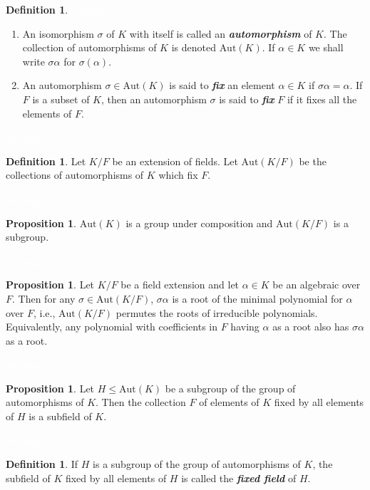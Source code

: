 \documentclass{article}
\theoremstyle{definition}
\newtheorem{prop}[thm]{Proposition}
\newtheorem{defn}[thm]{Definition}
\newcommand{\nl}{\textcolor{white}{nothing}}
\newcommand{\al}{\alpha}
\newcommand{\sig}{\sigma}
\newcommand{\Aut}{\text{Aut}}
\begin{document}
\begin{defn}\nl
\begin{enumerate}
\item An isomorphism $\sig$ of $K$ with itself is called an \textit{\textbf{automorphism}} of $K$. The collection of automorphisms of $K$ is denoted $\Aut(K)$. If $\al\in K$ we shall write $\sig\al$ for $\sig(\al)$.
\item An automorphism $\sig\in \Aut(K)$ is said to \textit{\textbf{fix}} an element $\al\in K$ if $\sig\al = \al$. If $F$ is a subset of $K$, then an automorphism $\sig$ is said to \textit{\textbf{fix}} $F$ if it fixes all the elements of $F$. 
\end{enumerate}
\end{defn}

\nl

\begin{defn}
Let $K/F$ be an extension of fields. Let $\Aut(K/F)$ be the collections of automorphisms of $K$ which fix $F$.
\end{defn}

\nl

\begin{prop}
$\Aut(K)$ is a group under composition and $\Aut(K/F)$ is a subgroup.
\end{prop}

\nl

\begin{prop}
Let $K/F$ be a field extension and let $\al \in K$ be an algebraic over $F$. Then for any $\sig\in \Aut(K/F)$, $\sig\al$ is a root of the minimal polynomial for $\al$ over $F$, i.e., $\Aut(K/F)$ permutes the roots of irreducible polynomials. Equivalently, any polynomial with coefficients in $F$ having $\al$ as a root also has $\sig\al$ as a root.
\end{prop}

\nl

\begin{prop}
Let $H\leq \Aut(K)$ be a subgroup of the group of automorphisms of $K$. Then the collection $F$ of elements of $K$ fixed by all elements of $H$ is a subfield of $K$.
\end{prop}

\nl

\begin{defn}
If $H$ is a subgroup of the group of automorphisms of $K$, the subfield of $K$ fixed by all elements of $H$ is called the \textit{\textbf{fixed field}} of $H$.
\end{defn}
\end{document}
